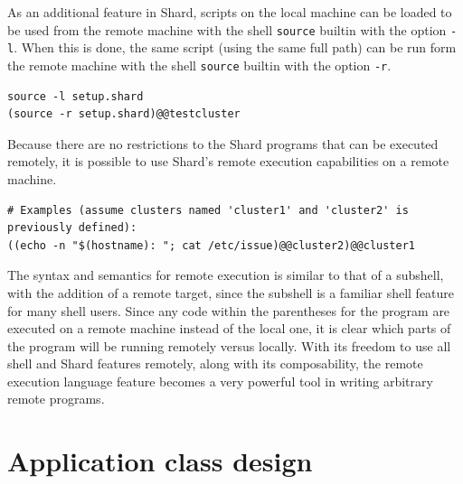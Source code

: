 \documentclass[twoside]{report}
\begin{document}
As an additional feature in Shard, scripts on the local machine can be loaded to be used from the remote machine with the shell \texttt{source} builtin with the option \texttt{-l}.
When this is done, the same script (using the same full path) can be run form the remote machine with the shell \texttt{source} builtin with the option \texttt{-r}.

\begin{minipage}[c]{\textwidth-15pt}
  \begin{lstlisting}[language=Shard]
source -l setup.shard
(source -r setup.shard)@@testcluster
\end{lstlisting}
  \smallskip
\end{minipage}

Because there are no restrictions to the Shard programs that can be executed remotely, it is possible to use Shard's remote execution capabilities on a remote machine.

\begin{minipage}[c]{\textwidth-15pt}
  \begin{lstlisting}[language=Shard]
# Examples (assume clusters named 'cluster1' and 'cluster2' is previously defined):
((echo -n "$(hostname): "; cat /etc/issue)@@cluster2)@@cluster1
\end{lstlisting}
  \smallskip
\end{minipage}

The syntax and semantics for remote execution is similar to that of a subshell, with the addition of a remote target, since the subshell is a familiar shell feature for many shell users.
Since any code within the parentheses for the program are executed on a remote machine instead of the local one, it is clear which parts of the program will be running remotely versus locally.
With its freedom to use all shell and Shard features remotely, along with its composability, the remote execution language feature becomes a very powerful tool in writing arbitrary remote programs.


\section{Application class design}

\end{document}
